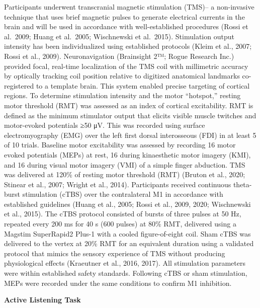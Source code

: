 \documentclass[
]{article}
\begin{document}
Participants underwent transcranial magnetic stimulation (TMS)-- a
non-invasive technique that uses brief magnetic pulses to generate
electrical currents in the brain and will be used in accordance with
well-established procedures (Rossi et al.~2009; Huang et al.~2005;
Wischnewski et al.~2015). Stimulation output intensity has been
individualized using established protocols (Kleim et al., 2007; Rossi et
al., 2009). Neuronavigation (Brainsight 2™; Rogue Research Inc.)
provided focal, real-time localization of the TMS coil with millimetric
accuracy by optically tracking coil position relative to digitized
anatomical landmarks co-registered to a template brain. This system
enabled precise targeting of cortical regions. To determine stimulation
intensity and the motor ``hotspot,'' resting motor threshold (RMT) was
assessed as an index of cortical excitability. RMT is defined as the
minimum stimulator output that elicits visible muscle twitches and
motor-evoked potentials ≥50 μV. This was recorded using surface
electromyography (EMG) over the left first dorsal interosseous (FDI) in
at least 5 of 10 trials. Baseline motor excitability was assessed by
recording 16 motor evoked potentials (MEPs) at rest, 16 during
kinaesthetic motor imagery (KMI), and 16 during visual motor imagery
(VMI) of a simple finger abduction. TMS was delivered at 120\% of
resting motor threshold (RMT) (Bruton et al., 2020; Stinear et al.,
2007; Wright et al., 2014). Participants received continuous theta-burst
stimulation (cTBS) over the contralateral M1 in accordance with
established guidelines (Huang et al., 2005; Rossi et al., 2009, 2020;
Wischnewski et al., 2015). The cTBS protocol consisted of bursts of
three pulses at 50 Hz, repeated every 200 ms for 40 s (600 pulses) at
80\% RMT, delivered using a Magstim SuperRapid2 Plus-1 with a cooled
figure-of-eight coil. Sham cTBS was delivered to the vertex at 20\% RMT
for an equivalent duration using a validated protocol that mimics the
sensory experience of TMS without producing physiological effects
(Kraeutner et al., 2016, 2017). All stimulation parameters were within
established safety standards. Following cTBS or sham stimulation, MEPs
were recorded under the same conditions to confirm M1 inhibition.

\textbf{Active Listening Task}
\end{document}

